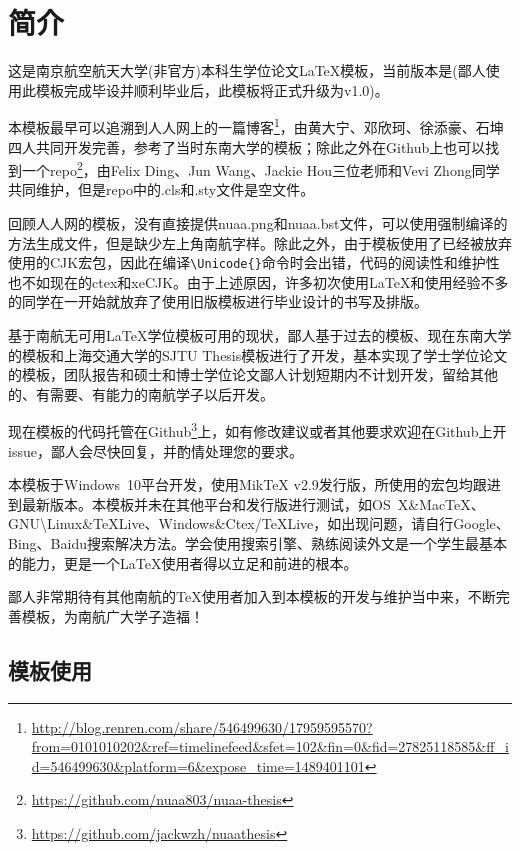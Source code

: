 \chapter{简介}\label{chap:intro}

这是南京航空航天大学(非官方)本科生学位论文\LaTeX 模板，当前版本是\version(鄙人使用此模板完成毕设并顺利毕业后，此模板将正式升级为v1.0)。

本模板最早可以追溯到人人网上的一篇博客\footnote{\url{http://blog.renren.com/share/546499630/17959595570?from=0101010202\&ref=timelinefeed\&sfet=102\&fin=0\&fid=27825118585\&ff\_id=546499630\&platform=6\&expose\_time=1489401101}}，由黄大宁、邓欣珂、徐添豪、石坤四人共同开发完善，参考了当时东南大学的\seuthesix 模板；除此之外在Github上也可以找到一个repo\footnote{\url{https://github.com/nuaa803/nuaa-thesis}}，由Felix Ding、Jun Wang、Jackie Hou三位老师和Vevi Zhong同学共同维护，但是repo中的.cls和.sty文件是空文件。

回顾人人网的模板，没有直接提供nuaa.png和nuaa.bst文件，可以使用强制编译的方法生成文件，但是缺少左上角南航字样。除此之外，由于模板使用了已经被放弃使用的CJK宏包，因此在编译\verb+\Unicode{}+命令时会出错，代码的阅读性和维护性也不如现在的ctex和xeCJK。由于上述原因，许多初次使用\LaTeX 和使用经验不多的同学在一开始就放弃了使用旧版模板进行毕业设计的书写及排版。

基于南航无可用\LaTeX 学位模板可用的现状，鄙人基于过去的\oldnuaathesis 模板、现在东南大学的\seuthesix 模板和上海交通大学的SJTU Thesis模板进行了开发，基本实现了学士学位论文的模板，团队报告和硕士和博士学位论文鄙人计划短期内不计划开发，留给其他的、有需要、有能力的南航学子以后开发。

现在\nuaathesis 模板的代码托管在Github\footnote{\url{https://github.com/jackwzh/nuaathesis}}上，如有修改建议或者其他要求欢迎在Github上开issue，鄙人会尽快回复，并酌情处理您的要求。

本模板于Windows~10平台开发，使用MikTeX v2.9发行版，所使用的宏包均跟进到最新版本。本模板并未在其他平台和发行版进行测试，如OS~X\&MacTeX、GNU\textbackslash Linux\&TeXLive、Windows\&Ctex/TeXLive，如出现问题，请自行Google、Bing、Baidu搜索解决方法。学会使用搜索引擎、熟练阅读外文是一个学生最基本的能力，更是一个\LaTeX 使用者得以立足和前进的根本。

鄙人非常期待有其他南航的\TeX 使用者加入到本模板的开发与维护当中来，不断完善模板，为南航广大学子造福！

\section{模板使用}

